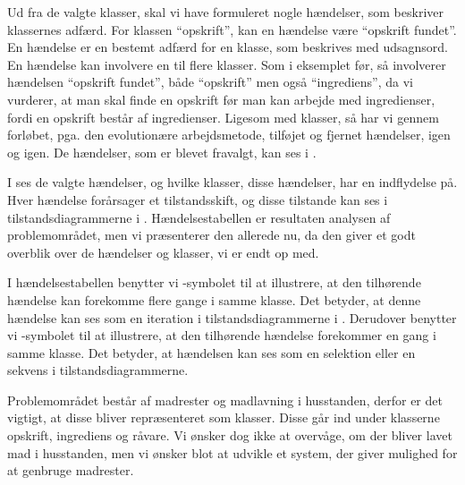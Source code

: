 Ud fra de valgte klasser, skal vi have formuleret nogle hændelser, som beskriver klassernes adfærd. For klassen ``opskrift'', kan en hændelse \fx være ``opskrift fundet''. En hændelse er en bestemt adfærd for en klasse, som beskrives med udsagnsord. En hændelse kan involvere en til flere klasser. Som i eksemplet før, så involverer hændelsen ``opskrift fundet'', både ``opskrift'' men også ``ingrediens'', da vi vurderer, at man skal finde en opskrift før man kan arbejde med ingredienser, fordi en opskrift består af ingredienser. Ligesom med klasser, så har vi gennem forløbet, pga. den evolutionære arbejdsmetode, tilføjet og fjernet hændelser, igen og igen. De hændelser, som er blevet fravalgt, kan ses i .

I  ses de valgte hændelser, og hvilke klasser, disse hændelser, har en indflydelse på. Hver hændelse forårsager et tilstandsskift, og disse tilstande kan ses i tilstandsdiagrammerne i . Hændelsestabellen er resultaten analysen af problemområdet, men vi præsenterer den allerede nu, da den giver et godt overblik over de hændelser og klasser, vi er endt op med. 

I hændelsestabellen benytter vi \iter-symbolet til at illustrere, at den tilhørende hændelse kan forekomme flere gange i samme klasse. Det betyder, at denne hændelse kan ses som en iteration i tilstandsdiagrammerne i . Derudover benytter vi \once-symbolet til at illustrere, at den tilhørende hændelse forekommer en gang i samme klasse. Det betyder, at hændelsen kan ses som en selektion eller en sekvens i tilstandsdiagrammerne.



Problemområdet består af madrester og madlavning i husstanden, derfor er det vigtigt, at disse bliver repræsenteret som klasser. Disse går ind under klasserne opskrift, ingrediens og råvare. Vi ønsker dog ikke at overvåge, om der bliver lavet mad i husstanden, men vi ønsker blot at udvikle et system, der giver mulighed for at genbruge madrester.
